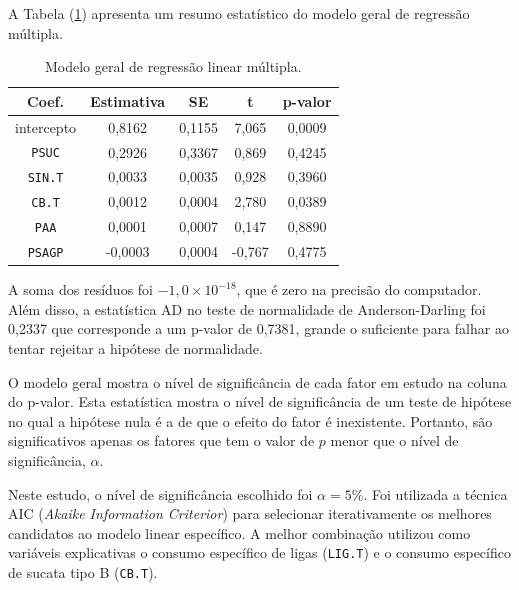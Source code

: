 \begin{multicols}{2}
	A Tabela (\ref{tab:mod_geral}) apresenta um resumo estatístico do modelo geral de regressão múltipla.
	\begin{table}[H]
	\begin{center}
	\begin{small}
		\caption{Modelo geral de regressão linear múltipla.}
		\label{tab:mod_geral}		
			\begin{tabular}{ccccc}
				\hline
				Coef. & Estimativa & SE & t & p-valor \\
				\hline \hline
				intercepto		&  0,8162 & 0,1155 &  7,065 & 0,0009 \\
				\texttt{PSUC}	&  0,2926 & 0,3367 &  0,869 & 0,4245 \\
				\texttt{SIN.T}  &  0,0033 & 0,0035 &  0,928 & 0,3960 \\
				\texttt{CB.T}	&  0,0012 & 0,0004 &  2,780 & 0,0389 \\
				\texttt{PAA}	&  0,0001 & 0,0007 &  0,147 & 0,8890 \\
				\texttt{PSAGP}	& -0,0003 & 0,0004 & -0,767 & 0,4775 \\
				\hline
			\end{tabular}
			\end{small}
			\end{center}
	\end{table}	
	A soma dos resíduos foi $-1,0\times10^{-18}$, que é zero na precisão do computador. Além disso, a estatística AD no teste de normalidade de Anderson-Darling\cite{wiki:ad} foi 0,2337 que corresponde a um p-valor de 0,7381, grande o suficiente para falhar ao tentar rejeitar a hipótese de normalidade.	
	
	O modelo geral mostra o nível de significância de cada fator em estudo na coluna do p-valor. Esta estatística mostra o nível de significância de um teste de hipótese no qual a hipótese nula é a de que o efeito do fator é inexistente. Portanto, são significativos apenas os fatores que tem o valor de $p$ menor que o nível de significância, $\alpha$. 
	
	Neste estudo, o nível de significância escolhido foi $\alpha = 5\%$. Foi utilizada a técnica AIC\cite{wiki:aic} (\textit{Akaike Information Criterior}) para selecionar iterativamente os melhores candidatos ao modelo linear específico. A melhor combinação utilizou como variáveis explicativas o consumo específico de ligas (\texttt{LIG.T}) e o consumo específico de sucata tipo B (\texttt{CB.T}).
	

\end{multicols}
